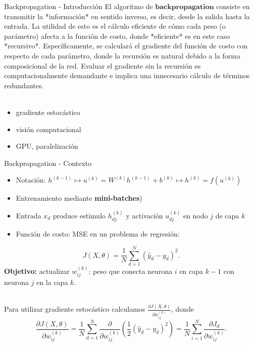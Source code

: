 \documentclass[handout, 9pt]{beamer}
\begin{document}
\begin{frame}{Backpropagation - Introducción}
El algoritmo de $\textbf{backpropagation}$ consiste en transmitir la *información* en sentido inverso, es decir, desde la salida hasta la entrada. La utilidad de esto es el cálculo eficiente de cómo cada peso (o parámetro) afecta a la función de costo, donde *eficiente* es en este caso *recursivo*. Específicamente, se calculará el gradiente del función de costo con respecto de cada parámetro, donde la recursión es natural debido a la forma composicional de la red. Evaluar el gradiente sin la recursión es computacionalmente demandante e implica una innecesario cálculo de términos redundantes.\\~\


\begin{itemize}
\item gradiente estocástico
\item visión computacional
\item GPU, paralelización
\end{itemize}




\end{frame}

\begin{frame}{Backpropagation - Contexto}

\begin{itemize}
  \item Notación: $h^{(k-1)} \mapsto u^{(k)} = W^{(k)} h^{(k-1)}  + b^{(k)} \mapsto h^{(k)} = f(u^{(k)})$ \pause

  \item Entrenamiento mediante \textbf{mini-batches})
  \item Entrada $x_d$ produce estimulo $h_{dj}^{(k)}$ y activación  $u_{dj}^{(k)}$ en nodo $j$ de capa $k$ \pause
 
 \item Función de costo: MSE en un problema de regresión:  \pause

\end{itemize} 
\[
J(X , \theta) = \frac{1}{N}\sum_{d=1}^N(\hat{y}_d-y_d)^2.
\]
\textbf{Objetivo:} actualizar $w_{ij}^{(k)}$: peso que conecta neurona $i$ en capa $k-1$ con neurona $j$ en la capa $k$. \\~\

Para utilizar gradiente estocástico calculamos $\frac{\partial J(X , \theta) }{\partial w_{ij}^{(k)}}$, donde \pause
\[
\frac{\partial J(X , \theta) }{\partial w_{ij}^{(k)}} = \frac{1}{N}\sum_{d=1}^N \frac{\partial}{\partial w_{ij}^{(k)}} \left ( \frac{1}{2}(\hat{y}_d-y_d)^2 \right) = \frac{1}{N}\sum_{i=1}^N \frac{\partial J_d}{\partial w_{ij}^{(k)}}.
\]
\end{frame}
\end{document}
